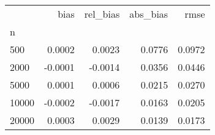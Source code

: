 \begin{tabular}{lrrrr}
\toprule
{} &    bias &  rel\_bias &  abs\_bias &   rmse \\
n     &         &           &           &        \\
\midrule
500   &  0.0002 &    0.0023 &    0.0776 & 0.0972 \\
2000  & -0.0001 &   -0.0014 &    0.0356 & 0.0446 \\
5000  &  0.0001 &    0.0006 &    0.0215 & 0.0270 \\
10000 & -0.0002 &   -0.0017 &    0.0163 & 0.0205 \\
20000 &  0.0003 &    0.0029 &    0.0139 & 0.0173 \\
\bottomrule
\end{tabular}
